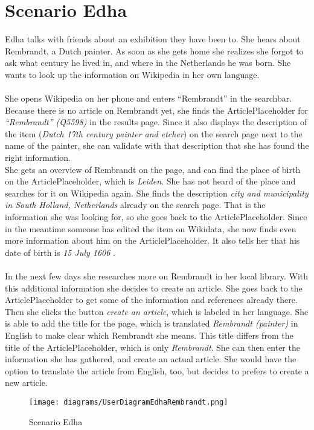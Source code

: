 \section{Scenario Edha} 
Edha talks with friends about an exhibition they have been to. She hears about Rembrandt, a Dutch painter. As soon as she gets home she realizes she forgot to ask what century he lived in, and where in the Netherlands he was born. She wants to look up the information on Wikipedia in her own language. \\
\\ 
She opens Wikipedia on her phone and enters ``Rembrandt'' in the searchbar. Because there is no article on Rembrandt yet, she finds the ArticlePlaceholder for \textit{``Rembrandt'' (Q5598)} \citep{wd:01} in the results page. Since it also displays the description of the item (\textit{Dutch 17th century painter and etcher}) on the search page next to the name of the painter, she can validate with that description that she has found the right information. \\
She gets an overview of Rembrandt on the page, and can find the place of birth on the ArticlePlaceholder, which is \textit{Leiden}. She has not heard of the place and searches for it on Wikipedia again. She finds the description \textit{city and municipality in South Holland, Netherlands} \citep{wd:02} already on the search page. That is the information she was looking for, so she goes back to the ArticlePlaceholder. Since in the meantime someone has edited the item on Wikidata, she now finds even more information about him on the ArticlePlaceholder. It also tells her that his date of birth is \textit{15 July 1606} \citep{wd:01}. \\
\\
In the next few days she researches more on Rembrandt in her local library. With this additional information she decides to create an article. She goes back to the ArticlePlaceholder to get some of the information and references already there. Then she clicks the button \textit{create an article}, which is labeled in her language. She is able to add the title for the page, which is translated \textit{Rembrandt (painter)} in English to make clear which Rembrandt she means. This title differs from the title of the ArticlePlaceholder, which is only \textit{Rembrandt}. She can then enter the information she has gathered, and create an actual article. She would have the option to translate the article from English, too, but decides to prefers to create a new article.
\begin{figure}[H]
	\centering
	\texttt{[image: diagrams/UserDiagramEdhaRembrandt.png]}
	\caption{Scenario Edha}
	\label{fig:ScenarioEdha}
\end{figure}

